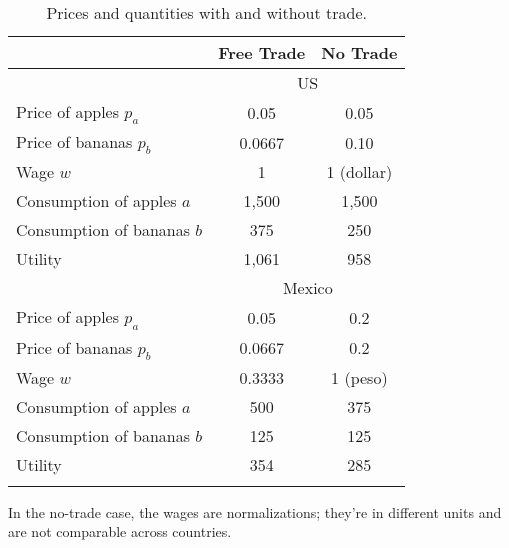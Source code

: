 \begin{table}[h]
\caption{Prices and quantities with and without trade.}
\label{tab:price_quant}
\centering
\begin{tabular*}{0.8\textwidth}{l@{\extracolsep{\fill}}cc}
\toprule
                                  &      Free Trade     &    No Trade    \\%
\midrule
                                  & \multicolumn{2}{c}{US} \\
\midrule%
Price of apples $p_{a}$           &         0.05        &      0.05      \\%
%
Price of bananas $p_{b}$          &         0.0667      &      0.10      \\%
%
Wage $w$                          &          1          &      1 (dollar)      \\%
%
Consumption of apples $a$         &          1,500      &      1,500      \\%
%
Consumption of bananas $b$        &          375        &     250      \\%
%
Utility                           &          1,061      &      958      \\%
\midrule
                                  & \multicolumn{2}{c}{Mexico} \\
\midrule%
Price of apples $p_{a}$           &         0.05        &      0.2      \\%
%
Price of bananas $p_{b}$          &          0.0667     &      0.2      \\%
%
Wage $w$                          &          0.3333     &      1 (peso)      \\%
%
Consumption of apples $a$         &          500        &      375      \\%
%
Consumption of bananas $b$        &          125       &       125      \\%
Utility                           &          354       &       285      \\%
\bottomrule
\addlinespace
\end{tabular*}
\begin{minipage}{0.8\textwidth}
\footnotesize{In the no-trade case, the wages are normalizations;
they're in different units and are not comparable across countries.}
\end{minipage}
\end{table}




